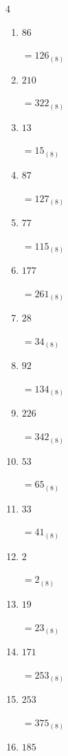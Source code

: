\begin{multicols}{4}
\begin{enumerate}
        $=321_{(8)}$

  \item $86$

        $=126_{(8)}$

  \item $210$

        $=322_{(8)}$

  \item $13$

        $=15_{(8)}$

  \item $87$

        $=127_{(8)}$

  \item $77$

        $=115_{(8)}$

  \item $177$

        $=261_{(8)}$

  \item $28$

        $=34_{(8)}$

  \item $92$

        $=134_{(8)}$

  \item $226$

        $=342_{(8)}$

  \item $53$

        $=65_{(8)}$

  \item $33$

        $=41_{(8)}$

  \item $2$

        $=2_{(8)}$

  \item $19$

        $=23_{(8)}$

  \item $171$

        $=253_{(8)}$

\columnbreak %

\resetques

  \item $253$

        $=375_{(8)}$

  \item $185$


\end{enumerate}
\end{multicols}
